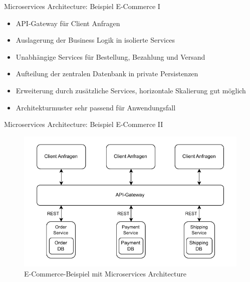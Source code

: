 \begin{frame}{Microservices Architecture: Beispiel E-Commerce I}
    \begin{itemize}
        \item API-Gateway für Client Anfragen
        \item Auslagerung der Business Logik in isolierte Services
        \item Unabhängige Services für Bestellung, Bezahlung und Versand
        \item Aufteilung der zentralen Datenbank in private Persistenzen
        \item Erweiterung durch zusätzliche Services, horizontale Skalierung gut möglich
        \item Architekturmuster sehr passend für Anwendungsfall
    \end{itemize}
\end{frame}

\begin{frame}{Microservices Architecture: Beispiel E-Commerce II}
    \begin{figure}[!h]
        \centering
        \includegraphics[scale=0.6]{imglib/microservices/ecommerce-microservices}
        \caption{E-Commerce-Beispiel mit Microservices Architecture}
        \label{fig:microservices-ecommerce}
    \end{figure}
\end{frame}


